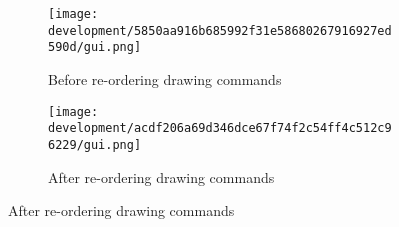 \documentclass[../development.tex]{subfiles}
\begin{document}
\begin{figure}[H]
	\hspace{0.03\linewidth}
	\begin{minipage}{0.45\linewidth}
		\begin{figure}[H]
			\centering
			\texttt{[image: development/5850aa916b685992f31e58680267916927ed590d/gui.png]}
			\caption{Before re-ordering drawing commands}
			\label{fig:development:5850aa916b685992f31e58680267916927ed590d:gui.png}
		\end{figure}
	\end{minipage} \hfill
	\begin{minipage}{0.45\linewidth}
		\begin{figure}[H]
			\centering
			\texttt{[image: development/acdf206a69d346dce67f74f2c54ff4c512c96229/gui.png]}
			\caption{After re-ordering drawing commands}
			\label{fig:development:acdf206a69d346dce67f74f2c54ff4c512c96229:gui.png}
		\end{figure}
	\end{minipage}
	\hspace{0.03\linewidth}
\end{figure}
\end{document}
